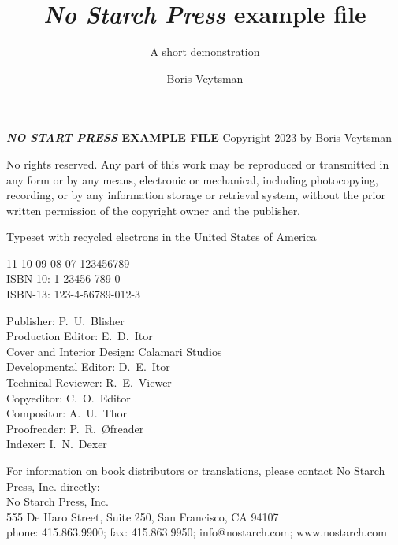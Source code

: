 \documentclass[cfonts,nofontsdir]{nostarch}
\begin{document}
\frontmatter

\author{Boris Veytsman}

\title{\emph{No Starch Press} example file}

\subtitle{A short demonstration}


\makehalftitle

\maketitle


\begin{copyrightpage}
  \textbf{\sffamily\MakeUppercase{\emph{No Start Press} example file}}
  Copyright \textcopyright{} 2023 by Boris Veytsman

  No rights reserved. Any part of this work may be reproduced or
  transmitted in any form or by any means, electronic or mechanical,
  including photocopying, recording, or by any information storage or
  retrieval system, without the prior written permission of the
  copyright owner and the publisher.

   Typeset
  with recycled electrons in the United States of America

11 10 09 08 07 \hspace{0.5in}  123456789\\
ISBN-10: 1-23456-789-0\\
ISBN-13: 123-4-56789-012-3

Publisher: P.~U.~Blisher\\
Production Editor: E.~D.~Itor\\
Cover and Interior Design: Calamari Studios\\
Developmental Editor: D.~E.~Itor\\
Technical Reviewer: R.~E.~Viewer\\
Copyeditor: C.~O.~Editor\\
Compositor: A.~U.~Thor\\
Proofreader: P.~R.~\O freader\\
Indexer: I.~N.~Dexer

For information on book distributors or translations, please contact
No Starch Press, Inc. directly: \\
No Starch Press, Inc.\\
555 De Haro Street, Suite 250, San Francisco, CA 94107\\
phone: 415.863.9900; fax: 415.863.9950; info@nostarch.com; www.nostarch.com\\


\end{copyrightpage}
\end{document}
